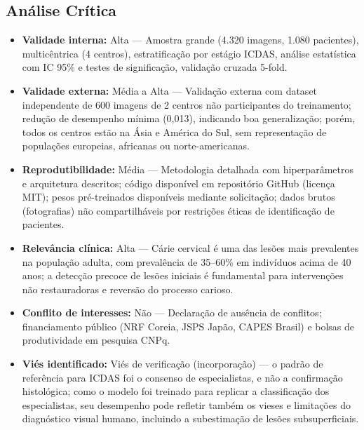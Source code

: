 \subsection{Análise Crítica}
\begin{itemize}
  \item \textbf{Validade interna:} Alta --- Amostra grande (4.320
        imagens, 1.080 pacientes), multicêntrica (4 centros),
        estratificação por estágio ICDAS, análise estatística com
        IC 95\% e testes de significação, validação cruzada 5-fold.
  \item \textbf{Validade externa:} Média a Alta --- Validação externa
        com dataset independente de 600 imagens de 2 centros não
        participantes do treinamento; redução de desempenho mínima
        (0,013), indicando boa generalização; porém, todos os centros
        estão na Ásia e América do Sul, sem representação de
        populações europeias, africanas ou norte-americanas.
  \item \textbf{Reprodutibilidade:} Média --- Metodologia detalhada com
        hiperparâmetros e arquitetura descritos; código disponível em
        repositório GitHub (licença MIT); pesos pré-treinados
        disponíveis mediante solicitação; dados brutos (fotografias)
        não compartilháveis por restrições éticas de identificação
        de pacientes.
  \item \textbf{Relevância clínica:} Alta --- Cárie cervical é uma das
        lesões mais prevalentes na população adulta, com prevalência
        de 35--60\% em indivíduos acima de 40 anos; a detecção
        precoce de lesões iniciais é fundamental para intervenções
        não restauradoras e reversão do processo carioso.
  \item \textbf{Conflito de interesses:} Não --- Declaração de ausência
        de conflitos; financiamento público (NRF Coreia, JSPS Japão,
        CAPES Brasil) e bolsas de produtividade em pesquisa CNPq.
  \item \textbf{Viés identificado:} Viés de verificação (incorporação)
        --- o padrão de referência para ICDAS foi o consenso de
        especialistas, e não a confirmação histológica; como o modelo
        foi treinado para replicar a classificação dos especialistas,
        seu desempenho pode refletir também os vieses e limitações
        do diagnóstico visual humano, incluindo a subestimação de
        lesões subsuperficiais.
\end{itemize}

